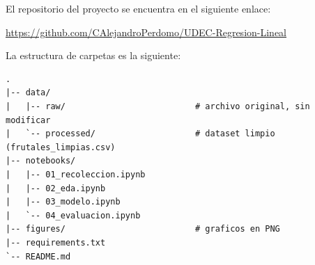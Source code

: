 \documentclass[11pt,a4paper]{article}
\begin{document}
El repositorio del proyecto se encuentra en el siguiente enlace:

\begin{center}
\url{https://github.com/CAlejandroPerdomo/UDEC-Regresion-Lineal}
\end{center}

La estructura de carpetas es la siguiente:

\begin{verbatim}
.
|-- data/
|   |-- raw/                          # archivo original, sin modificar
|   `-- processed/                    # dataset limpio (frutales_limpias.csv)
|-- notebooks/
|   |-- 01_recoleccion.ipynb
|   |-- 02_eda.ipynb
|   |-- 03_modelo.ipynb
|   `-- 04_evaluacion.ipynb
|-- figures/                          # graficos en PNG
|-- requirements.txt
`-- README.md
\end{verbatim}
\end{document}

